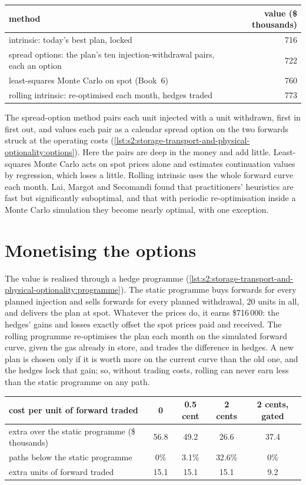 \begin{center}
\small
\begin{tabular}{@{}lr@{}}
\toprule
method & value (\$ thousands)\\
\midrule
intrinsic: today's best plan, locked & 716\\
spread options: the plan's ten injection-withdrawal pairs, each an option & 722\\
least-squares Monte Carlo on spot (Book~6) & 760\\
rolling intrinsic: re-optimised each month, hedges traded & 773\\
\bottomrule
\end{tabular}
\end{center}

The spread-option method pairs each unit injected with a unit withdrawn, first in first out, and values each pair as a calendar spread option on the
two forwards struck at the operating costs (\cref{lst:s2:storage-transport-and-physical-optionality:options}). Here the pairs are deep in the money
and add little. Least-squares Monte Carlo acts on spot prices alone and estimates continuation values by regression, which loses a little.
Rolling intrinsic uses the whole forward curve each month. Lai, Margot and Secomandi found that practitioners' heuristics are fast but significantly
suboptimal, and that with periodic re-optimisation inside a Monte Carlo simulation they become nearly optimal, with one exception.

\section{Monetising the options}

The value is realised through a hedge programme (\cref{lst:s2:storage-transport-and-physical-optionality:programme}). The static programme buys
forwards for every planned injection and sells forwards for every planned withdrawal, 20 units in all, and delivers the plan at spot. Whatever the
prices do, it earns \$716\,000: the hedges' gains and losses exactly offset the spot prices paid and received. The rolling programme re-optimises the
plan each month on the simulated forward curve, given the gas already in store, and trades the difference in hedges. A new plan is chosen only if
it is worth more on the current curve than the old one, and the hedges lock that gain; so, without trading costs, rolling can never earn less than
the static programme on any path.

\begin{center}
\small
\begin{tabular}{@{}lcccc@{}}
\toprule
cost per unit of forward traded & 0 & 0.5 cent & 2 cents & 2 cents, gated\\
\midrule
extra over the static programme (\$ thousands) & 56.8 & 49.2 & 26.6 & 37.4\\
paths below the static programme & 0\% & 3.1\% & 32.6\% & 0\%\\
extra units of forward traded & 15.1 & 15.1 & 15.1 & 9.2\\
\bottomrule
\end{tabular}
\end{center}

